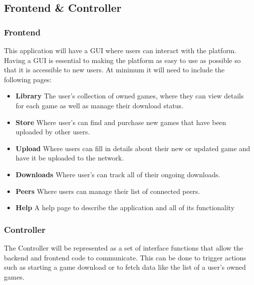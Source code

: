 \subsection*{Frontend \& Controller}

\subsubsection{Frontend}\label{subsubsec:frontend}

This application will have a GUI   where users can interact with the platform. Having a GUI is essential to making the platform as easy to use as possible so that it is accessible to new users. At minimum it will need to include the following pages:

\begin{itemize}
  \item \textbf{Library} The user's collection of owned games, where they can view details for each game as well as manage their download status.
  \item \textbf{Store} Where user's can find and purchase new games that have been uploaded by other users.
  \item \textbf{Upload} Where users can fill in details about their new or updated game and have it be uploaded to the network.
  \item \textbf{Downloads} Where user's can track all of their ongoing downloads.
  \item \textbf{Peers} Where users can manage their list of connected peers.
  \item \textbf{Help} A help page to describe the application and all of its functionality 
\end{itemize}


\subsubsection{Controller}

The Controller will be represented as a set of interface functions that allow the backend and frontend code to communicate. This can be done to trigger actions such as starting a game download or to fetch data like the list of a user's owned games.
